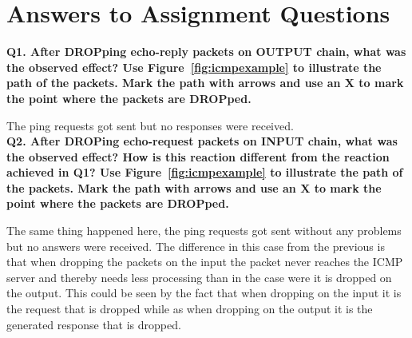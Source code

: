 \section{Answers to Assignment Questions}

\noindent \textbf{Q1. After DROPping echo-reply packets on OUTPUT chain, what 
was the observed effect? Use Figure~\ref{fig:icmpexample} to illustrate the 
path of the packets. Mark the path with arrows and use an X to mark the point 
where the packets are DROPped.}

The ping requests got sent but no responses were received.
\\

\noindent \textbf{Q2. After DROPing echo-request packets on INPUT chain, what
was the observed effect? How is this reaction different from the reaction
achieved in Q1? Use Figure~\ref{fig:icmpexample} to illustrate the path of 
the packets. Mark the path with arrows and use an X to mark the point where the
packets are DROPped.}

The same thing happened here, the ping requests got sent without any problems but 
no answers were received. The difference in this case from the previous is that
when dropping the packets on the input the packet never reaches the 
ICMP server and thereby needs less processing than in the case were it is dropped
on the output. This could be seen by the fact that when dropping on the input it 
is the request that is dropped while as when dropping on the output it is the 
generated response that is dropped.
\\

